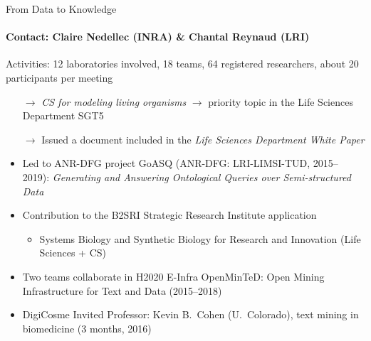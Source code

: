 \begin{frame}{From Data to Knowledge}
\framesubtitle{Contact: Claire Nedellec (INRA) \& Chantal Reynaud (LRI)}
\vspace{-5mm}
{\color{blue} }

Activities: 12 laboratories involved, 18 teams, 64 registered researchers, about 20 participants per meeting
%
\begin{itemize}
  \small
  \item[$\rightarrow$] \emph{CS for modeling living organisms} $\rightarrow$ priority topic in the Life Sciences Department SGT5
  \item[$\rightarrow$] Issued a document included in the \emph{Life Sciences Department White Paper}

\item Led to ANR-DFG project GoASQ (ANR-DFG: LRI-LIMSI-TUD, 2015--2019): \emph{Generating and Answering Ontological Queries over Semi-structured Data}
\item Contribution to the B2SRI Strategic Research Institute application
  \begin{itemize}
  \item Systems Biology and Synthetic Biology for Research and Innovation (Life Sciences + CS)
  \end{itemize}
\item Two teams collaborate in H2020 E-Infra OpenMinTeD: Open Mining Infrastructure for Text and Data (2015--2018)
\item DigiCosme Invited Professor: Kevin B.\ Cohen (U.\ Colorado), text mining in biomedicine (3 months, 2016)
\end{itemize}
\end{frame}


